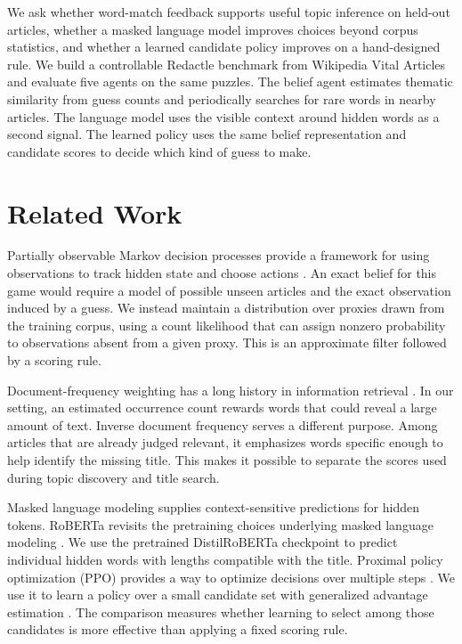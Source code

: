 \documentclass[conference]{IEEEtran}
\begin{document}
We ask whether word-match feedback supports useful topic inference on held-out articles, whether a masked language model improves choices beyond corpus statistics, and whether a learned candidate policy improves on a hand-designed rule. We build a controllable Redactle benchmark from Wikipedia Vital Articles and evaluate five agents on the same puzzles. The belief agent estimates thematic similarity from guess counts and periodically searches for rare words in nearby articles. The language model uses the visible context around hidden words as a second signal. The learned policy uses the same belief representation and candidate scores to decide which kind of guess to make.

\section{Related Work}
Partially observable Markov decision processes provide a framework for using observations to track hidden state and choose actions \cite{pomdp}. An exact belief for this game would require a model of possible unseen articles and the exact observation induced by a guess. We instead maintain a distribution over proxies drawn from the training corpus, using a count likelihood that can assign nonzero probability to observations absent from a given proxy. This is an approximate filter followed by a scoring rule.

Document-frequency weighting has a long history in information retrieval \cite{salton}. In our setting, an estimated occurrence count rewards words that could reveal a large amount of text. Inverse document frequency serves a different purpose. Among articles that are already judged relevant, it emphasizes words specific enough to help identify the missing title. This makes it possible to separate the scores used during topic discovery and title search.

Masked language modeling supplies context-sensitive predictions for hidden tokens. RoBERTa revisits the pretraining choices underlying masked language modeling \cite{roberta}. We use the pretrained DistilRoBERTa checkpoint \cite{distil} to predict individual hidden words with lengths compatible with the title. Proximal policy optimization (PPO) provides a way to optimize decisions over multiple steps \cite{ppo}. We use it to learn a policy over a small candidate set with generalized advantage estimation \cite{gae}. The comparison measures whether learning to select among those candidates is more effective than applying a fixed scoring rule.
\end{document}
